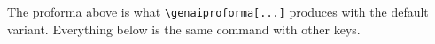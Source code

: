 \documentclass[a4paper,11pt]{article}
\begin{document}
\genaiproforma[learning={worked through the Unit 2 derivations}, improving]

\begin{question}
  \qpart
  The proforma above is what \verb|\genaiproforma[...]| produces with the
  default variant. Everything below is the same command with other keys.
\end{question}

\clearpage

\genaiproforma[none, frame, showinstruction=false]

\genaiproforma[variant=demo-27j, module=M249, coding, starting]
\end{document}
